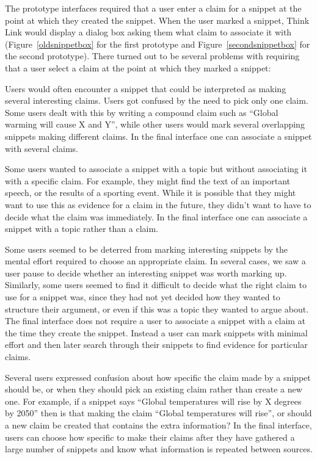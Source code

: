 \documentclass{chi2009}
\begin{document}
The prototype interfaces required that a user enter a claim for a snippet at the point at which they created the snippet. When the user marked a snippet, Think Link would display a dialog box asking them what claim to associate it with (Figure~\ref{oldsnippetbox} for the first prototype and Figure~\ref{secondsnippetbox} for the second prototype). There turned out to be several problems with requiring that a user select a claim at the point at which they marked a snippet:  %

Users would often encounter a snippet that could be interpreted as making several interesting claims. Users got confused by the need to pick only one claim. Some users dealt with this by writing a compound claim such as ``Global warming will cause X and Y'', while other users would mark several overlapping snippets making different claims. In the final interface one can associate a snippet with several claims.

Some users wanted to associate a snippet with a topic but without associating it with a specific claim. For example, they might find the text of an important speech, or the results of a sporting event. While it is possible that they might want to use this as evidence for a claim in the future, they didn't want to have to decide what the claim was immediately. In the final interface one can associate a snippet with a topic rather than a claim.

Some users seemed to be deterred from marking interesting snippets by the mental effort required to choose an appropriate claim. In several cases, we saw a user pause to decide whether an interesting snippet was worth marking up. Similarly, some users seemed to find it difficult to decide what the right claim to use for a snippet was, since they had not yet decided how they wanted to structure their argument, or even if this was a topic they wanted to argue about. The final interface does not require a user to associate a snippet with a claim at the time they create the snippet. Instead a user can mark snippets with minimal effort and then later search through their snippets to find evidence for particular claims.

Several users expressed confusion about how specific the claim made by a snippet should be, or when they should pick an existing claim rather than create a new one. For example, if a snippet says ``Global temperatures will rise by X degrees by 2050'' then is that making the claim ``Global temperatures will rise'', or should a new claim be created that contains the extra information? In the final interface, users can choose how specific to make their claims after they have gathered a large number of snippets and know what information is repeated between sources.
\end{document}
